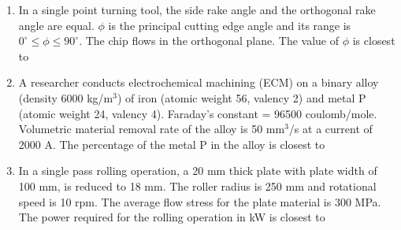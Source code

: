 \documentclass[journal,12pt,onecolumn]{IEEEtran}
\begin{document}
\begin{enumerate}[resume]
    \item In a single point turning tool, the side rake angle and the orthogonal rake angle are equal. $\phi$ is the principal cutting edge angle and its range is $0^\circ \le \phi \le 90^\circ$. The chip flows in the orthogonal plane. The value of $\phi$ is closest to\\

          \begin{enumerate}
          \end{enumerate}

    \item A researcher conducts electrochemical machining (ECM) on a binary alloy (density 6000 kg/m$^3$) of iron (atomic weight 56, valency 2) and metal P (atomic weight 24, valency 4). Faraday's constant = 96500 coulomb/mole. Volumetric material removal rate of the alloy is 50 mm$^3$/s at a current of 2000 A. The percentage of the metal P in the alloy is closest to\\

          \begin{enumerate}
          \end{enumerate}

    \item In a single pass rolling operation, a 20 mm thick plate with plate width of 100 mm, is reduced to 18 mm. The roller radius is 250 mm and rotational speed is 10 rpm. The average flow stress for the plate material is 300 MPa. The power required for the rolling operation in kW is closest to\\

          \begin{enumerate}
          \end{enumerate}


\end{enumerate}
\end{document}
